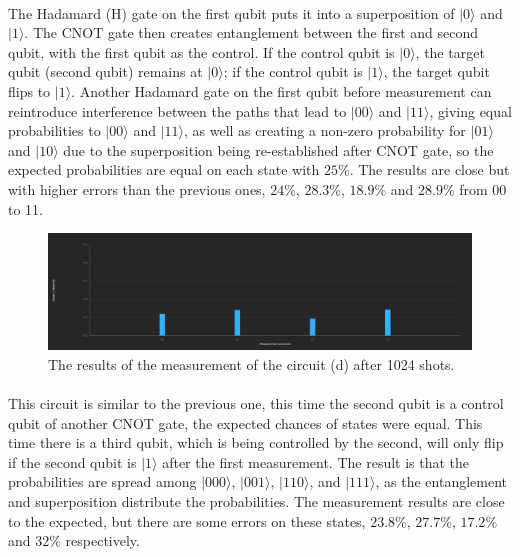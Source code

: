 \documentclass[12pt]{article}
\begin{document}
\paragraph*{}

The Hadamard (H) gate on the first qubit puts it into a superposition of $|0⟩$ and $|1⟩$. The CNOT gate then creates entanglement between the first and second qubit, with the first qubit as the control. If the control qubit is $|0⟩$, the target qubit (second qubit) remains at $|0⟩$; if the control qubit is $|1⟩$, the target qubit flips to $|1⟩$. Another Hadamard gate on the first qubit before measurement can reintroduce interference between the paths that lead to $|00⟩$ and $|11⟩$, giving equal probabilities to $|00⟩$ and $|11⟩$, as well as creating a non-zero probability for $|01⟩$ and $|10⟩$ due to the superposition being re-established after CNOT gate, so the expected probabilities are equal on each state with $25\%$. The results are close but with higher errors than the previous ones, $24\%$, $28.3\%$, $18.9\%$ and $28.9\%$ from 00 to 11.    

\begin{figure}[H]
    \centering
    \includegraphics[scale=0.27]{d.png}
    \caption{The results of the measurement of the circuit (d) after 1024 shots.}
\end{figure}

\newpage

\paragraph*{}

This circuit is similar to the previous one, this time the second qubit is a control qubit of another CNOT gate, the expected chances of states were equal. This time there is a third qubit, which is being controlled by the second, will only flip if the second qubit is $|1⟩$ after the first measurement. The result is that the probabilities are spread among $|000⟩$, $|001⟩$, $|110⟩$, and $|111⟩$, as the entanglement and superposition distribute the probabilities. The measurement results are close to the expected, but there are some errors on these states, $23.8\%$, $27.7\%$, $17.2\%$ and $32\%$ respectively.
\end{document}

